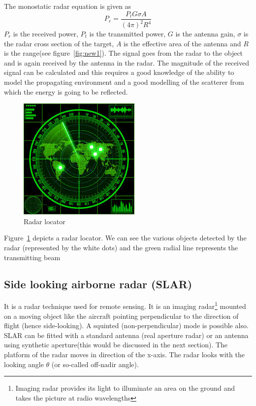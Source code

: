The monostatic radar equation is given as
\begin{dmath*}
P_{r}= \frac{P_t G\sigma A}{(4\pi)^{2}R^{4}}
\end{dmath*}
$P_{r}$ is the received power, $P_t$ is the transmitted power, $G$ is the antenna gain, $\sigma$ is the radar cross section of the target, $A$ is the effective area of the antenna and $R$ is the range(see  figure~\ref{fig:new1}). The signal goes from the radar to the object and is again received by the antenna in the radar. The magnitude of the received signal can be calculated and this requires a good knowledge of the ability to model the propagating environment and a good modelling of the scatterer from which the energy is going to be reflected.

\begin{figure}[h]
\centering
\includegraphics[scale=0.5]{./graphics/Radarlocator}
\caption{Radar locator}
\label{fig:radarlocator}
\end{figure}

Figure~\ref{fig:radarlocator} depicts a radar locator. We can see the various objects detected by the radar (represented by the white dots) and the green radial line represents the transmitting beam

\subsection{Side looking airborne radar (SLAR)} 
It is a radar technique used for remote sensing. It is an imaging radar\footnote{Imaging radar provides its light to illuminate an area on the ground and takes the picture at radio wavelengths} mounted on a moving object like the aircraft pointing perpendicular to the direction of flight (hence side-looking). A squinted (non-perpendicular) mode is possible also. SLAR can be fitted with a standard antenna (real aperture radar) or an antenna using synthetic aperture(this would be discussed in the next section). The platform of the radar moves in direction of the x-axis. The radar looks with the looking angle $\theta$ (or so-called off-nadir angle).

